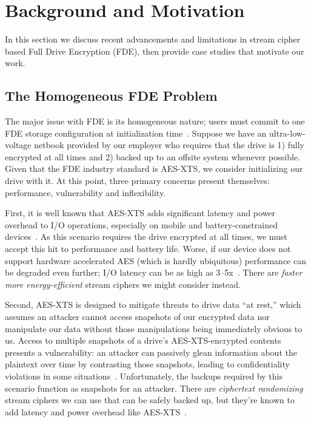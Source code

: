 \section{Background and Motivation}\label{sec:motivation}

In this section we discuss recent advancements and limitations in stream cipher
based Full Drive Encryption (FDE), then provide \numCases case studies that
motivate our work.


\subsection{The Homogeneous FDE Problem}

The major issue with FDE is its homogeneous nature; users must commit to one FDE
storage configuration at initialization time~\cite{dmcrypt}. Suppose we have an
ultra-low-voltage netbook provided by our employer who requires that the drive
is 1) fully encrypted at all times and 2) backed up to an offsite system
whenever possible. Given that the FDE industry standard is AES-XTS, we consider
initializing our drive with it. At this point, three primary concerns present
themselves: performance, vulnerability and inflexibility.

First, it is well known that AES-XTS adds significant latency and power overhead
to I/O operations, especially on mobile and battery-constrained
devices~\cite{google-engadget, android-M-mobile-motivation,
android-M-mobile-motivation-2}. As this scenario requires the drive encrypted at
all times, we must accept this hit to performance and battery life. Worse, if
our device does not support hardware accelerated AES (which is hardly
ubiquitous) performance can be degraded even further; I/O latency can be as high
as 3--5x~\cite{StrongBox}. There are {\em faster more energy-efficient} stream
ciphers we might consider instead.

Second, AES-XTS is designed to mitigate threats to drive data ``at rest,'' which
assumes an attacker cannot access snapshots of our encrypted data nor manipulate
our data without those manipulations being immediately obvious to us. Access to
multiple snapshots of a drive's AES-XTS-encrypted contents presents a
vulnerability: an attacker can passively glean information about the plaintext
over time by contrasting those snapshots, leading to confidentiality violations
in some situations~\cite{XEX, XTS}. Unfortunately, the backups required by this
scenario function as snapshots for an attacker. There are {\em ciphertext
randomizing} stream ciphers we can use that can be safely backed up, but they're
known to add latency and power overhead like AES-XTS~\cite{Freestyle}.

